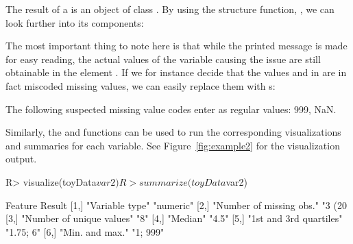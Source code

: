 \documentclass[article,shortnames]{jss}
\begin{document}
The result of a  is an object of class
. By using the structure function, , we can
look further into its components:

\begin{Schunk}
\end{Schunk}

The most important thing to note here is that while the printed
message is made for easy reading, the actual values of the variable
causing the issue are still obtainable in the element
. If we for instance decide that the values 
and  in  are in fact miscoded missing values, we can
easily replace them with s:

\begin{Schunk}
\begin{Soutput}
The following suspected missing value codes enter as regular values: 999, NaN.
\end{Soutput}
\end{Schunk}

Similarly, the  and  functions can be
used to run the corresponding visualizations and summaries for each
variable. See Figure~\ref{fig:example2} for the visualization output.

\begin{Schunk}
\begin{Sinput}
R> visualize(toyData$var2)
R> summarize(toyData$var2)
\end{Sinput}
\begin{Soutput}
     Feature                   Result    
[1,] "Variable type"           "numeric" 
[2,] "Number of missing obs."  "3 (20 %
[3,] "Number of unique values" "8"       
[4,] "Median"                  "4.5"     
[5,] "1st and 3rd quartiles"   "1.75; 6" 
[6,] "Min. and max."           "1; 999"  
\end{Soutput}
\end{Schunk}
\end{document}
